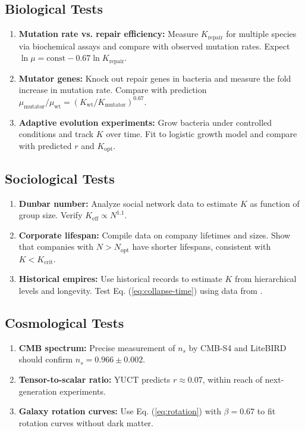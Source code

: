 \documentclass[12pt,a4paper]{article}
\theoremstyle{remark}
\newcommand{\Keff}{K_{\mathrm{eff}}}
\begin{document}
	\subsection{Biological Tests}
	
	\begin{enumerate}
		\item \textbf{Mutation rate vs. repair efficiency:} Measure $K_{\text{repair}}$ for multiple species via biochemical assays and compare with observed mutation rates. Expect $\ln \mu = \text{const} - 0.67 \ln K_{\text{repair}}$.
		\item \textbf{Mutator genes:} Knock out repair genes in bacteria and measure the fold increase in mutation rate. Compare with prediction $\mu_{\text{mutator}}/\mu_{\text{wt}} = (K_{\text{wt}}/K_{\text{mutator}})^{0.67}$.
		\item \textbf{Adaptive evolution experiments:} Grow bacteria under controlled conditions and track $K$ over time. Fit to logistic growth model and compare with predicted $r$ and $K_{\text{opt}}$.
	\end{enumerate}
	
	\subsection{Sociological Tests}
	
	\begin{enumerate}
		\item \textbf{Dunbar number:} Analyze social network data to estimate $K$ as function of group size. Verify $\Keff \propto N^{1.1}$.
		\item \textbf{Corporate lifespan:} Compile data on company lifetimes and sizes. Show that companies with $N > N_{\text{opt}}$ have shorter lifespans, consistent with $K < K_{\text{crit}}$.
		\item \textbf{Historical empires:} Use historical records to estimate $K$ from hierarchical levels and longevity. Test Eq. (\ref{eq:collapse-time}) using data from \cite{TurchinNefedov2009}.
	\end{enumerate}
	
	\subsection{Cosmological Tests}
	
	\begin{enumerate}
		\item \textbf{CMB spectrum:} Precise measurement of $n_s$ by CMB-S4 and LiteBIRD should confirm $n_s = 0.966 \pm 0.002$.
		\item \textbf{Tensor-to-scalar ratio:} YUCT predicts $r \approx 0.07$, within reach of next-generation experiments.
		\item \textbf{Galaxy rotation curves:} Use Eq. (\ref{eq:rotation}) with $\beta = 0.67$ to fit rotation curves without dark matter.
	\end{enumerate}
	
\end{document}
